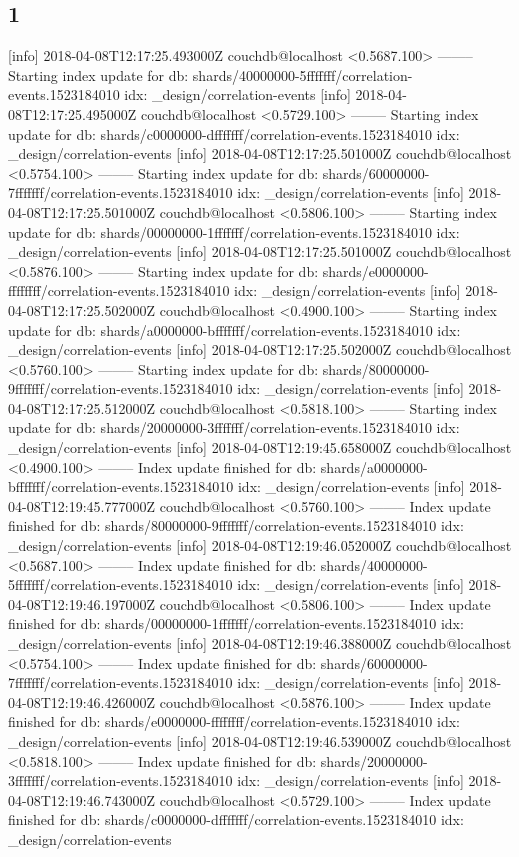 \subsection{1}
[info] 2018-04-08T12:17:25.493000Z couchdb@localhost <0.5687.100> -------- Starting index update for db: shards/40000000-5fffffff/correlation-events.1523184010 idx: _design/correlation-events
[info] 2018-04-08T12:17:25.495000Z couchdb@localhost <0.5729.100> -------- Starting index update for db: shards/c0000000-dfffffff/correlation-events.1523184010 idx: _design/correlation-events
[info] 2018-04-08T12:17:25.501000Z couchdb@localhost <0.5754.100> -------- Starting index update for db: shards/60000000-7fffffff/correlation-events.1523184010 idx: _design/correlation-events
[info] 2018-04-08T12:17:25.501000Z couchdb@localhost <0.5806.100> -------- Starting index update for db: shards/00000000-1fffffff/correlation-events.1523184010 idx: _design/correlation-events
[info] 2018-04-08T12:17:25.501000Z couchdb@localhost <0.5876.100> -------- Starting index update for db: shards/e0000000-ffffffff/correlation-events.1523184010 idx: _design/correlation-events
[info] 2018-04-08T12:17:25.502000Z couchdb@localhost <0.4900.100> -------- Starting index update for db: shards/a0000000-bfffffff/correlation-events.1523184010 idx: _design/correlation-events
[info] 2018-04-08T12:17:25.502000Z couchdb@localhost <0.5760.100> -------- Starting index update for db: shards/80000000-9fffffff/correlation-events.1523184010 idx: _design/correlation-events
[info] 2018-04-08T12:17:25.512000Z couchdb@localhost <0.5818.100> -------- Starting index update for db: shards/20000000-3fffffff/correlation-events.1523184010 idx: _design/correlation-events
[info] 2018-04-08T12:19:45.658000Z couchdb@localhost <0.4900.100> -------- Index update finished for db: shards/a0000000-bfffffff/correlation-events.1523184010 idx: _design/correlation-events
[info] 2018-04-08T12:19:45.777000Z couchdb@localhost <0.5760.100> -------- Index update finished for db: shards/80000000-9fffffff/correlation-events.1523184010 idx: _design/correlation-events
[info] 2018-04-08T12:19:46.052000Z couchdb@localhost <0.5687.100> -------- Index update finished for db: shards/40000000-5fffffff/correlation-events.1523184010 idx: _design/correlation-events
[info] 2018-04-08T12:19:46.197000Z couchdb@localhost <0.5806.100> -------- Index update finished for db: shards/00000000-1fffffff/correlation-events.1523184010 idx: _design/correlation-events
[info] 2018-04-08T12:19:46.388000Z couchdb@localhost <0.5754.100> -------- Index update finished for db: shards/60000000-7fffffff/correlation-events.1523184010 idx: _design/correlation-events
[info] 2018-04-08T12:19:46.426000Z couchdb@localhost <0.5876.100> -------- Index update finished for db: shards/e0000000-ffffffff/correlation-events.1523184010 idx: _design/correlation-events
[info] 2018-04-08T12:19:46.539000Z couchdb@localhost <0.5818.100> -------- Index update finished for db: shards/20000000-3fffffff/correlation-events.1523184010 idx: _design/correlation-events
[info] 2018-04-08T12:19:46.743000Z couchdb@localhost <0.5729.100> -------- Index update finished for db: shards/c0000000-dfffffff/correlation-events.1523184010 idx: _design/correlation-events

